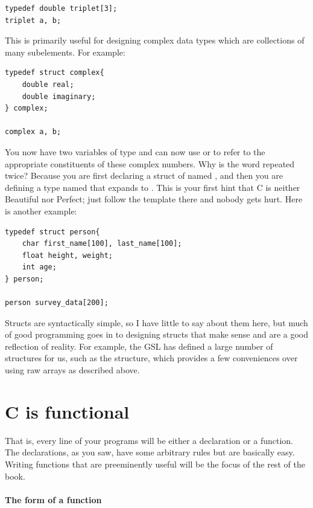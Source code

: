 \documentclass[12pt]{article}
\makeatletter
\def\ttindex#1{\index{#1@\cinline{#1}}}
\makeatother
\begin{document}
\begin{lstlisting}
typedef double triplet[3];
triplet	a, b;
\end{lstlisting}

This is primarily useful for designing
complex data types which are collections of many subelements. \ttindex{struct}
For example:

\begin{lstlisting}
typedef struct complex{
    double real;
    double imaginary;
} complex;

complex a, b;
\end{lstlisting}

You now have two variables of type  and can now use  or  to refer to the appropriate constituents
of these complex numbers. Why is the word  repeated
twice? Because you are first declaring a struct of named ,
and then you are defining a type named  that expands to
. This is your first hint that C is neither Beautiful
nor Perfect; just follow the template there and nobody gets hurt. Here is
another example:
\begin{lstlisting}
typedef struct person{
    char first_name[100], last_name[100];
    float height, weight;
    int age;
} person;

person survey_data[200];
\end{lstlisting}

Structs are syntactically simple, so I have little to say about them here,
but much of good programming goes in to designing structs that make sense
and are a good reflection of reality.  For example, the GSL has defined
a large number of structures for us, such as the 
structure, which provides a few conveniences over using raw arrays as
described above.

\section{C is functional} \label{functional}

That is, every line of your programs will be either a declaration or a
function. The declarations, as you saw, have some arbitrary rules but
are basically easy.  Writing functions that are preeminently useful will
be the focus of the rest of the book.

\paragraph{The form of a function}
\end{document}

